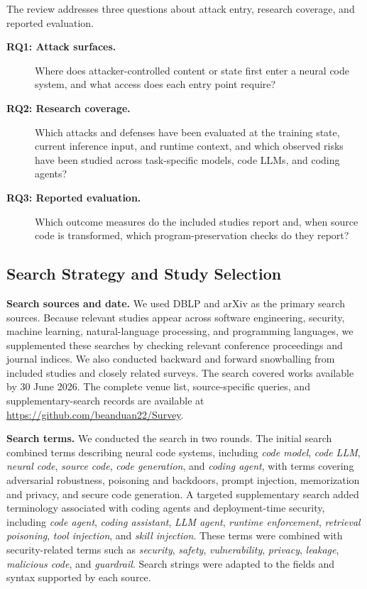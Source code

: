 \documentclass[acmsmall,screen,review]{acmart}
\begin{document}
The review addresses three questions about attack entry, research coverage, and reported evaluation.

\begin{description}
\item[\textbf{RQ1: Attack surfaces.}]
Where does attacker-controlled content or state first enter a neural code system, and what access does each entry point require?

\item[\textbf{RQ2: Research coverage.}]
Which attacks and defenses have been evaluated at the training state, current inference input, and runtime context, and which observed risks have been studied across task-specific models, code LLMs, and coding agents?

\item[\textbf{RQ3: Reported evaluation.}]
Which outcome measures do the included studies report and, when source code is transformed, which program-preservation checks do they report?
\end{description}

\subsection{Search Strategy and Study Selection}

\noindent\textbf{Search sources and date.}
We used DBLP and arXiv as the primary search sources. Because relevant studies appear across software engineering, security, machine learning, natural-language processing, and programming languages, we supplemented these searches by checking relevant conference proceedings and journal indices. We also conducted backward and forward snowballing from included studies and closely related surveys. The search covered works available by 30 June 2026. The complete venue list, source-specific queries, and supplementary-search records are available at \url{https://github.com/beanduan22/Survey}.

\noindent\textbf{Search terms.}
We conducted the search in two rounds. The initial search combined terms describing neural code systems, including \emph{code model}, \emph{code LLM}, \emph{neural code}, \emph{source code}, \emph{code generation}, and \emph{coding agent}, with terms covering adversarial robustness, poisoning and backdoors, prompt injection, memorization and privacy, and secure code generation. A targeted supplementary search added terminology associated with coding agents and deployment-time security, including \emph{code agent}, \emph{coding assistant}, \emph{LLM agent}, \emph{runtime enforcement}, \emph{retrieval poisoning}, \emph{tool injection}, and \emph{skill injection}. These terms were combined with security-related terms such as \emph{security}, \emph{safety}, \emph{vulnerability}, \emph{privacy}, \emph{leakage}, \emph{malicious code}, and \emph{guardrail}. Search strings were adapted to the fields and syntax supported by each source.
\end{document}
